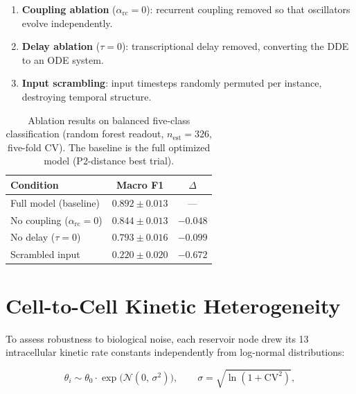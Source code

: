 \documentclass[journal=asbcd6,manuscript=suppinfo]{achemso}
\begin{document}
\begin{enumerate}
  \item \textbf{Coupling ablation} ($\alpha_{\mathrm{rc}} = 0$): recurrent coupling removed so that oscillators evolve independently.
  \item \textbf{Delay ablation} ($\tau = 0$): transcriptional delay removed, converting the DDE to an ODE system.
  \item \textbf{Input scrambling}: input timesteps randomly permuted per instance, destroying temporal structure.
\end{enumerate}

\begin{table}[H]
    \centering
    \caption{Ablation results on balanced five-class classification (random forest readout, $n_{\mathrm{est}} = 326$, five-fold CV). The baseline is the full optimized model (P2-distance best trial).}\label{tab:si-ablation-per-fold}
    \small
    \begin{tabular}{lcc}
        \toprule
        Condition & Macro F1 & $\Delta$ \\
        \midrule
        Full model (baseline) & $0.892 \pm 0.013$ & --- \\
        No coupling ($\alpha_{\mathrm{rc}} = 0$) & $0.844 \pm 0.013$ & $-0.048$ \\
        No delay ($\tau = 0$) & $0.793 \pm 0.016$ & $-0.099$ \\
        Scrambled input & $0.220 \pm 0.020$ & $-0.672$ \\
        \bottomrule
    \end{tabular}
\end{table}

\section{Cell-to-Cell Kinetic Heterogeneity}\label{sec:heterogeneity}

To assess robustness to biological noise, each reservoir node drew its 13 intracellular kinetic rate constants independently from log-normal distributions:

\begin{equation}
  \theta_i \sim \theta_0 \cdot \exp\!\bigl(\mathcal{N}(0,\,\sigma^2)\bigr), \qquad \sigma = \sqrt{\ln(1 + \mathrm{CV}^2)},
\end{equation}
\end{document}
